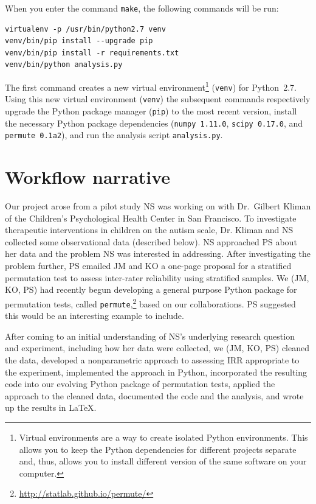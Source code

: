 \documentclass[]{article}
\begin{document}
When you enter the command \texttt{make}, the following commands will be run:
\begin{verbatim}
virtualenv -p /usr/bin/python2.7 venv
venv/bin/pip install --upgrade pip
venv/bin/pip install -r requirements.txt
venv/bin/python analysis.py
\end{verbatim}
The first command creates a new virtual environment\footnote{
Virtual environments are a way to create isolated Python environments.
This allows you to keep the Python dependencies for different
projects separate and, thus, allows you to install different
version of the same software on your computer.
}
(\texttt{venv}) for Python~2.7.
Using this new virtual environment (\texttt{venv}) the subsequent commands
respectively upgrade the Python package manager (\texttt{pip}) to the most
recent version, install the necessary Python package dependencies
(\texttt{numpy~1.11.0}, \texttt{scipy~0.17.0}, and \texttt{permute~0.1a2}),
and run the analysis script \texttt{analysis.py}.

\section{Workflow narrative}

Our project arose from a pilot study NS was working on with Dr.~Gilbert Kliman of
the Children's Psychological Health Center in San Francisco.
To investigate therapeutic interventions in children on the autism scale,
Dr. Kliman and NS collected some observational data (described below).
NS approached PS about her data and
the problem NS was interested in addressing.
After investigating the problem further, PS emailed JM and KO a one-page
proposal for a stratified permutation test to assess inter-rater
reliability using stratified samples.
We (JM, KO, PS) had recently begun developing a general purpose Python package
for permutation tests, called
\texttt{permute},\footnote{\url{http://statlab.github.io/permute/}}
based on our collaborations.
PS suggested this would be an interesting example to include.

After coming to an initial understanding of NS's underlying research question
and experiment, including how her data were collected, we (JM, KO, PS) 
cleaned the data, developed a nonparametric approach to assessing IRR
appropriate to the experiment, implemented the approach in Python, incorporated
the resulting code into our evolving Python package of permutation tests,
applied the approach to the cleaned data, documented the code and the analysis,
and wrote up the results in \LaTeX. 
\end{document}
